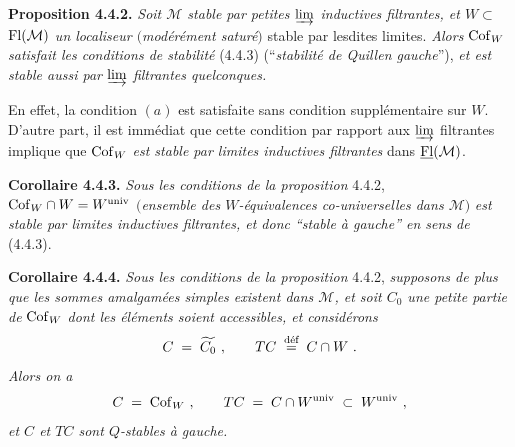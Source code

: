 \textbf{Proposition 4.4.2.} \textit{Soit $\mathcal{M}$ stable par petites $\varinjlim$ inductives filtrantes, et $W\subset$} $\mathrm{Fl}(\mathcal{M})$ \textit{un localiseur $($modérément saturé$)$} stable par lesdites limites. \textit{Alors} $\mathrm{Cof}_W$ \textit{satisfait les conditions de stabilité} (4.4.3) (“\textit{stabilité de Quillen gauche}”), \textit{et est stable aussi par $\varinjlim$ filtrantes quelconques.}

En effet, la condition $(a)$ est satisfaite sans condition supplémentaire sur $W$. D'autre part, il est immédiat que cette condition par rapport aux $\varinjlim$ filtrantes implique que $\mathrm{Cof}_W$ \textit{est stable par limites inductives filtrantes} dans $\underline{\mathrm{Fl}}(\mathcal{M})$.

\textbf{Corollaire 4.4.3.} \textit{Sous les conditions de la proposition} 4.4.2, $\mathrm{Cof}_W\cap W=W^{\mathrm{univ}}$ $($\textit{ensemble des $W$-équivalences co-universelles dans $\mathcal{M}$}$)$ \textit{est stable par limites inductives filtrantes, et donc “stable à gauche” en sens de} (4.4.3).

\textbf{Corollaire 4.4.4.} \textit{Sous les conditions de la proposition} 4.4.2, \textit{supposons de plus que les sommes amalgamées simples existent dans $\mathcal{M}$, et soit $C_0$ une petite partie de} $\mathrm{Cof}_W$ \textit{dont les éléments soient accessibles, et considérons}
\[
C\;=\;\widetilde{C_0}\ ,\qquad TC\;\deq\;C\cap W\ .
\]
\textit{Alors on a}
\[
C\;=\;\mathrm{Cof}_W\ ,\qquad TC\;=\;C\cap W^{\mathrm{univ}}\;\subset\;W^{\mathrm{univ}}\ ,
\]
\textit{et $C$ et $TC$ sont $Q$-stables à gauche.}


